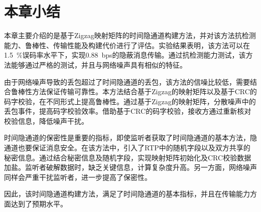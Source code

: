 \section{本章小结}
\label{chap:zigzag:summary}

本章主要介绍的是基于Zigzag映射矩阵的时间隐通道构建方法，并对该方法抗检测能力、鲁棒性、传输性能及构建代价进行了评估。实验结果表明，该方法可以在{1.5\ \%}误码率水平下，实现{0.88\ bps}的隐蔽消息传输。通过抗检测能力测试，该方法能够通过严格的测试，并且与网络噪声具有相似的特征。

由于网络噪声导致的丢包超过了时间隐通道的丢包，该方法的信噪比较低，需要结合鲁棒性方法保证传输可靠性。本方法结合基于Zigzag的映射矩阵以及基于CRC的码字校验，在不同形式上提高鲁棒性。通过基于Zigzag的映射矩阵，分散噪声中的丢包事件，提高码字校验效率。借助基于CRC的码字校验，接收方通过重新核对校验信息，降低噪声干扰。

时间隐通道的保密性是重要的指标，即使监听者获取了时间隐通道的基本方法，隐通道也要保证消息安全。在该方法中，引入了RTP中的随机字段以及双方共享的秘密信息。通过结合秘密信息及随机字段，实现映射矩阵初始化及CRC校验数据加盐。监听者破解数据时，缺乏关键信息，计算复杂度升高。另一方面，网络噪声同样会严重干扰监听者，进一步提高了保密性。

因此，该时间隐通道构建方法，满足了时间隐通道的基本指标，并且在传输能力方面达到了预期水平。